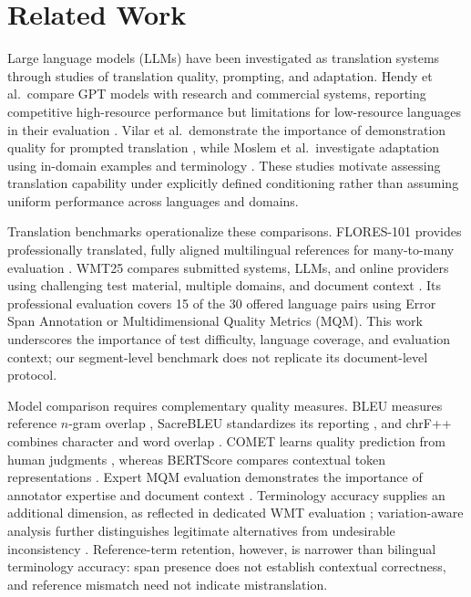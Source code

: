 \section{Related Work}
\label{sec:resources}

Large language models (LLMs) have been investigated as translation systems through studies of
translation quality, prompting, and adaptation. Hendy et al.\ compare GPT models with research
and commercial systems, reporting competitive high-resource performance but limitations for
low-resource languages in their evaluation \cite{hendy2023}. Vilar et al.\ demonstrate the
importance of demonstration quality for prompted translation \cite{vilar2023}, while Moslem
et al.\ investigate adaptation using in-domain examples and terminology \cite{moslem2023}.
These studies motivate assessing translation capability under explicitly defined conditioning
rather than assuming uniform performance across languages and domains.

Translation benchmarks operationalize these comparisons. FLORES-101 provides professionally
translated, fully aligned multilingual references for many-to-many evaluation \cite{goyal2022}.
WMT25 compares submitted systems, LLMs, and online providers using challenging test material,
multiple domains, and document context \cite{kocmi2025}. Its professional evaluation covers
15 of the 30 offered language pairs using Error Span Annotation or Multidimensional Quality
Metrics (MQM). This work underscores the importance of test difficulty, language coverage,
and evaluation context; our segment-level benchmark does not replicate its document-level protocol.

Model comparison requires complementary quality measures. BLEU measures reference $n$-gram
overlap \cite{papineni2002}, SacreBLEU standardizes its reporting \cite{post2018}, and chrF++
combines character and word overlap \cite{popovic2017}. COMET learns quality prediction from
human judgments \cite{rei2020}, whereas BERTScore compares contextual token representations
\cite{zhang2020}. Expert MQM evaluation demonstrates the importance of annotator expertise
and document context \cite{freitag2021}. Terminology accuracy supplies an additional dimension,
as reflected in dedicated WMT evaluation \cite{alam2021}; variation-aware analysis further
distinguishes legitimate alternatives from undesirable inconsistency \cite{dahan2026}.
Reference-term retention, however, is narrower than bilingual terminology accuracy: span presence
does not establish contextual correctness, and reference mismatch need not indicate mistranslation.

